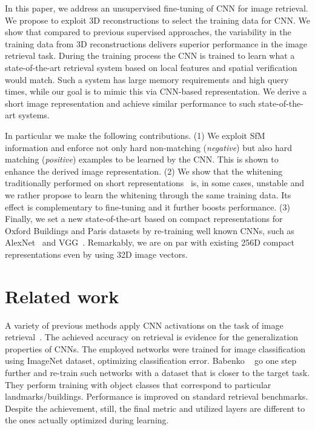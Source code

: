 \documentclass[runningheads]{llncs}
\begin{document}
In this paper, we address an unsupervised fine-tuning of CNN for image retrieval. 
We propose to exploit 3D reconstructions to select the training data for CNN. We show that compared to previous supervised approaches, the variability in the training data from 3D reconstructions delivers superior performance in the image retrieval task. 
During the training process the CNN is trained to learn what a state-of-the-art retrieval system based on local features and spatial verification would match. 
Such a system  has large memory requirements and high query times, while our goal is to mimic this via CNN-based representation.
We derive a short image representation and achieve similar performance to such state-of-the-art systems.

In particular we make the following contributions.
(1) We exploit SfM information and enforce not only hard non-matching (\emph{negative}) but also hard matching (\emph{positive}) examples to be learned by the CNN. This is shown to enhance the derived image representation.
(2) We show that the whitening traditionally performed on short representations~\cite{JC12} is, in some cases, unstable and we rather propose to learn the whitening through the same training data. Its effect is complementary to fine-tuning and it further boosts performance. 
(3) Finally, we set a new state-of-the-art based on compact representations for Oxford Buildings and Paris datasets by re-training well known CNNs, such as AlexNet~\cite{KSH12} and VGG~\cite{SZ14}.
Remarkably, we are on par with existing 256D compact representations even by using 32D image vectors.

 \section{Related work}
A variety of previous methods apply CNN activations on the task of image retrieval~\cite{GWGL14,RSMC14,BL15,KMO15,TSJ16,ZZWWT16}.
The achieved accuracy on retrieval is evidence for the generalization properties of CNNs. 
The employed networks were trained for image classification using ImageNet dataset, optimizing classification error.
Babenko \etal~\cite{BSCL14} go one step further and re-train such networks with a dataset that is closer to the target task.
They perform training with object classes that correspond to particular landmarks/buildings. 
Performance is improved on standard retrieval benchmarks.
Despite the achievement, still, the final metric and utilized layers are different to the ones actually optimized during learning.
\end{document}
